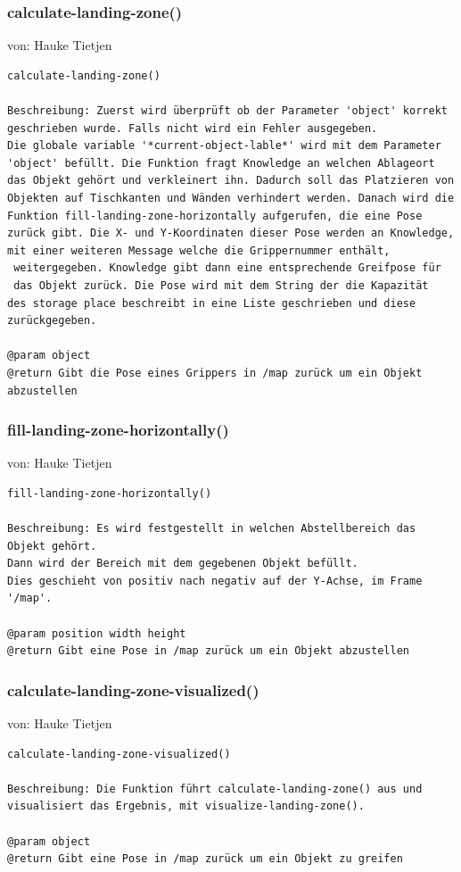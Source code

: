 \documentclass{suturo}
\makeatletter
\newcommand{\chapterauthor}[1]{%
  {\parindent0pt\vspace*{-27pt}%
  \linespread{0}\small\begin{flushright}von: #1\end{flushright}%
  \par\nobreak\vspace*{0pt}}
  \@afterheading%
}
\makeatother
\begin{document}
\subsubsection{calculate-landing-zone()}
\chapterauthor{Hauke Tietjen}
\begin{verbatim}
calculate-landing-zone()

Beschreibung: Zuerst wird überprüft ob der Parameter 'object' korrekt 
geschrieben wurde. Falls nicht wird ein Fehler ausgegeben. 
Die globale variable '*current-object-lable*' wird mit dem Parameter 
'object' befüllt. Die Funktion fragt Knowledge an welchen Ablageort 
das Objekt gehört und verkleinert ihn. Dadurch soll das Platzieren von 
Objekten auf Tischkanten und Wänden verhindert werden. Danach wird die 
Funktion fill-landing-zone-horizontally aufgerufen, die eine Pose 
zurück gibt. Die X- und Y-Koordinaten dieser Pose werden an Knowledge, 
mit einer weiteren Message welche die Grippernummer enthält,
 weitergegeben. Knowledge gibt dann eine entsprechende Greifpose für 
 das Objekt zurück. Die Pose wird mit dem String der die Kapazität 
des storage place beschreibt in eine Liste geschrieben und diese
zurückgegeben.

@param object
@return Gibt die Pose eines Grippers in /map zurück um ein Objekt abzustellen
\end{verbatim}

\subsubsection{fill-landing-zone-horizontally()}
\chapterauthor{Hauke Tietjen}
\begin{verbatim}
fill-landing-zone-horizontally()

Beschreibung: Es wird festgestellt in welchen Abstellbereich das Objekt gehört.
Dann wird der Bereich mit dem gegebenen Objekt befüllt.
Dies geschieht von positiv nach negativ auf der Y-Achse, im Frame '/map'.

@param position width height
@return Gibt eine Pose in /map zurück um ein Objekt abzustellen
\end{verbatim}

\subsubsection{calculate-landing-zone-visualized()}
\chapterauthor{Hauke Tietjen}
\begin{verbatim}
calculate-landing-zone-visualized()

Beschreibung: Die Funktion führt calculate-landing-zone() aus und
visualisiert das Ergebnis, mit visualize-landing-zone().

@param object
@return Gibt eine Pose in /map zurück um ein Objekt zu greifen
\end{verbatim}
\end{document}
